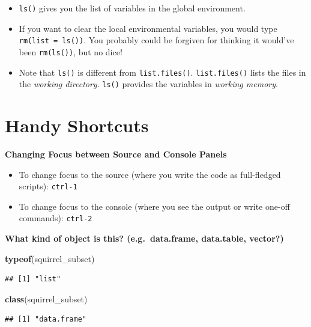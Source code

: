 \documentclass[
]{book}
\newenvironment{Shaded}{\begin{snugshade}}{\end{snugshade}}
\newcommand{\KeywordTok}[1]{\textcolor[rgb]{0.13,0.29,0.53}{\textbf{#1}}}
\newcommand{\NormalTok}[1]{#1}
\begin{document}
\begin{itemize}
\item
  \texttt{ls()} gives you the list of variables in the global environment.
\item
  If you want to clear the local environmental variables, you would type \texttt{rm(list\ =\ ls())}. You probably could be forgiven for thinking it would've been \texttt{rm(ls())}, but no dice!
\item
  Note that \texttt{ls()} is different from \texttt{list.files()}. \texttt{list.files()} lists the files in the \emph{working directory}. \texttt{ls()} provides the variables in \emph{working memory}.
\end{itemize}

\hypertarget{handy-shortcuts}{%
\section{Handy Shortcuts}\label{handy-shortcuts}}

\textbf{Changing Focus between Source and Console Panels}

\begin{itemize}
\item
  To change focus to the source (where you write the code as full-fledged scripts): \texttt{ctrl-1}
\item
  To change focus to the console (where you see the output or write one-off commands): \texttt{ctrl-2}
\end{itemize}

\textbf{What kind of object is this? (e.g.~data.frame, data.table, vector?)}

\begin{Shaded}
\begin{Highlighting}[]
  \KeywordTok{typeof}\NormalTok{(squirrel_subset)}
\end{Highlighting}
\end{Shaded}

\begin{verbatim}
## [1] "list"
\end{verbatim}

\begin{Shaded}
\begin{Highlighting}[]
  \KeywordTok{class}\NormalTok{(squirrel_subset)}
\end{Highlighting}
\end{Shaded}

\begin{verbatim}
## [1] "data.frame"
\end{verbatim}
\end{document}

